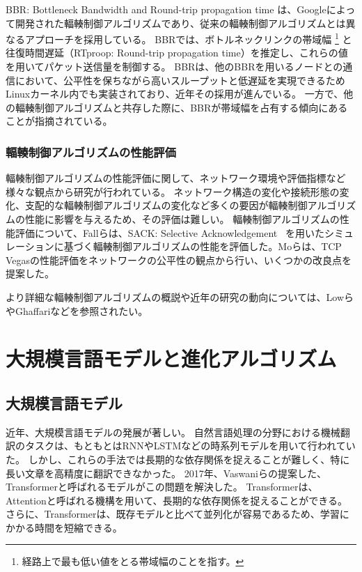 \documentclass[a4paper,11pt]{jreport}
\begin{document}
BBR: Bottleneck Bandwidth and Round-trip propagation time は、Googleによって開発された輻輳制御アルゴリズムであり、従来の輻輳制御アルゴリズムとは異なるアプローチを採用している。
BBRでは、ボトルネックリンクの帯域幅
\footnote{経路上で最も低い値をとる帯域幅のことを指す。}
と往復時間遅延（RTproop: Round-trip propagation time）を推定し、これらの値を用いてパケット送信量を制御する。
BBRは、他のBBRを用いるノードとの通信において、公平性を保ちながら高いスループットと低遅延を実現できるためLinuxカーネル内でも実装されており、近年その採用が進んでいる。
一方で、他の輻輳制御アルゴリズムと共存した際に、BBRが帯域幅を占有する傾向にあることが指摘されている。

\subsubsection*{輻輳制御アルゴリズムの性能評価}
\label{section:congestion_control_algorithm_evaluation}

輻輳制御アルゴリズムの性能評価に関して、ネットワーク環境や評価指標など様々な観点から研究が行われている。
ネットワーク構造の変化や接続形態の変化、支配的な輻輳制御アルゴリズムの変化など多くの要因が輻輳制御アルゴリズムの性能に影響を与えるため、その評価は難しい。
輻輳制御アルゴリズムの性能評価について、Fallら\cite{fall1996simulation}は、SACK: Selective Acknowledgement ~\cite{rfc2018}を用いたシミュレーションに基づく輻輳制御アルゴリズムの性能を評価した。Moら\cite{752178}は、TCP Vegasの性能評価をネットワークの公平性の観点から行い、いくつかの改良点を提案した。

より詳細な輻輳制御アルゴリズムの概説や近年の研究の動向については、Lowら\cite{980245}やGhaffari\cite{GHAFFARI2015101}などを参照されたい。

\section{大規模言語モデルと進化アルゴリズム}

\subsection{大規模言語モデル}

近年、大規模言語モデルの発展が著しい。
自然言語処理の分野における機械翻訳のタスクは、もともとはRNN\cite{graves2014generating}やLSTM\cite{6795963}などの時系列モデルを用いて行われていた。
しかし、これらの手法では長期的な依存関係を捉えることが難しく、特に長い文章を高精度に翻訳できなかった。
2017年、Vaswaniら\cite{attention}の提案した、Transformerと呼ばれるモデルがこの問題を解決した。
Transformerは、Attentionと呼ばれる機構を用いて、長期的な依存関係を捉えることができる。
さらに、Transformerは、既存モデルと比べて並列化が容易であるため、学習にかかる時間を短縮できる。
\end{document}
